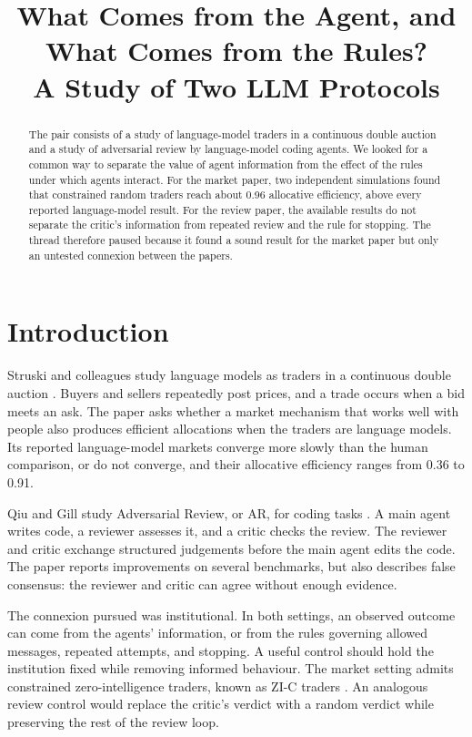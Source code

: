 \documentclass{article}
\title{What Comes from the Agent, and What Comes from the Rules?\\A Study of Two LLM Protocols}
\author{}
\date{}
\begin{document}
\maketitle

\begin{abstract}
The pair consists of a study of language-model traders in a continuous double auction and a study of adversarial review by language-model coding agents. We looked for a common way to separate the value of agent information from the effect of the rules under which agents interact. For the market paper, two independent simulations found that constrained random traders reach about 0.96 allocative efficiency, above every reported language-model result. For the review paper, the available results do not separate the critic's information from repeated review and the rule for stopping. The thread therefore paused because it found a sound result for the market paper but only an untested connexion between the papers.
\end{abstract}

\section{Introduction}

Struski and colleagues study language models as traders in a continuous double auction \cite{Q}. Buyers and sellers repeatedly post prices, and a trade occurs when a bid meets an ask. The paper asks whether a market mechanism that works well with people also produces efficient allocations when the traders are language models. Its reported language-model markets converge more slowly than the human comparison, or do not converge, and their allocative efficiency ranges from 0.36 to 0.91.

Qiu and Gill study Adversarial Review, or AR, for coding tasks \cite{P}. A main agent writes code, a reviewer assesses it, and a critic checks the review. The reviewer and critic exchange structured judgements before the main agent edits the code. The paper reports improvements on several benchmarks, but also describes false consensus: the reviewer and critic can agree without enough evidence.

The connexion pursued was institutional. In both settings, an observed outcome can come from the agents' information, or from the rules governing allowed messages, repeated attempts, and stopping. A useful control should hold the institution fixed while removing informed behaviour. The market setting admits constrained zero-intelligence traders, known as ZI-C traders \cite{gode-sunder}. An analogous review control would replace the critic's verdict with a random verdict while preserving the rest of the review loop.
\end{document}
